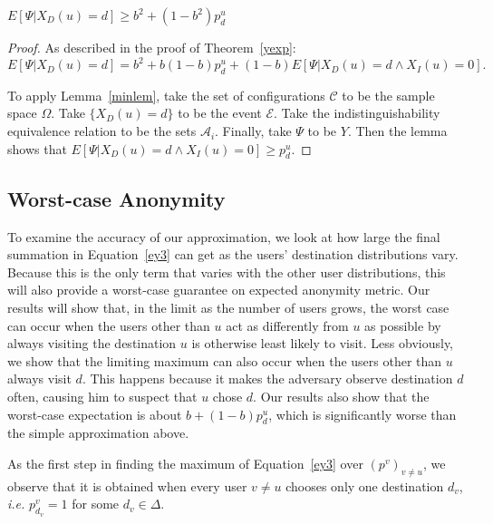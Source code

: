 \documentclass[prodmode,acmtissec]{acmsmall}
\begin{document}
\begin{theorem} \label{thm:lwrbnd}
$E[\Psi | X_D(u)=d] \ge  b^2 + (1-b^2)p^u_d$
\end{theorem}
\begin{proof}
As described in the proof of Theorem~\ref{yexp}:
\begin{equation*}
E[\Psi | X_D(u)=d] = b^2 + b(1-b)p^u_d + (1-b)E[\Psi | X_D(u)=d \land X_I(u)=0].
\end{equation*}

To apply Lemma~\ref{minlem}, take the set of configurations $\mathcal{C}$ to be the sample space $\Omega$.  Take $\{X_D(u)=d\}$ to be the event $\mathcal{E}$.  Take the indistinguishability equivalence relation to be the sets $\mathcal{A}_i$.  Finally, take $\Psi$ to be $Y$.  Then the lemma shows that $E[\Psi | X_D(u)=d \land X_I(u)=0]\ge p^u_d$.
\end{proof}

\subsection{Worst-case Anonymity}
To examine the accuracy of our approximation, we look at how large the final summation in Equation~\ref{ey3} can get as the users' destination distributions vary.  Because this is the only term that varies with the other user distributions, this will also provide a worst-case guarantee on expected anonymity metric.  Our results will show that, in the limit as the number of users grows, the worst case can occur when the users other than $u$ act as differently from $u$ as possible by always visiting the destination $u$ is otherwise least likely to visit.  Less obviously, we show that the limiting maximum can also occur when the users other than $u$ always visit $d$.  This happens because it makes the adversary observe destination $d$ often, causing him to suspect that $u$ chose $d$.  Our results also show that the worst-case expectation is about $b+(1-b)p^u_d$, which is significantly worse than the simple approximation above.

As the first step in finding the maximum of Equation~\ref{ey3} over $(p^v)_{v\neq u}$, we observe that it is obtained when every user $v\neq u$ chooses only one destination $d_v$, \emph{i.e.} $p^v_{d_v}=1$ for some $d_v\in \Delta$.
\end{document}
